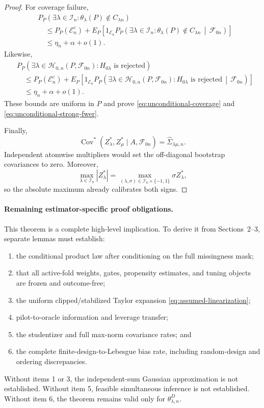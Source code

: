 \documentclass[11pt]{article}
\theoremstyle{definition}
\newcommand{\1}{\mathbf 1}\newcommand{\op}{\operatorname}
\begin{document}
\begin{proof}
For coverage failure,
\begin{align*}
&P_P\!\left(
\exists\lambda\in\mathcal I_n:
\theta_\lambda(P)\notin C_{\lambda n}
\right)
\\
&\quad\le
P_P(\mathcal E_n^c)
+
E_P\!\left[
1_{\mathcal E_n}
P_P\!\left(
\exists\lambda\in\mathcal I_n:
\theta_\lambda(P)\notin C_{\lambda n}
\,\middle|\,
\mathcal F_{0n}
\right)
\right]
\\
&\quad\le
\eta_n+\alpha+o(1).
\end{align*}
Likewise,
\begin{align*}
&P_P\!\left(
\exists\lambda\in\mathcal H_{0,n}(P,\mathcal F_{0n}):
H_{0\lambda}\text{ is rejected}
\right)
\\
&\quad\le
P_P(\mathcal E_n^c)
+
E_P\!\left[
1_{\mathcal E_n}
P_P\!\left(
\exists\lambda\in\mathcal H_{0,n}(P,\mathcal F_{0n}):
H_{0\lambda}\text{ is rejected}
\,\middle|\,
\mathcal F_{0n}
\right)
\right]
\\
&\quad\le
\eta_n+\alpha+o(1).
\end{align*}
These bounds are uniform in $P$ and prove
\eqref{eq:unconditional-coverage} and
\eqref{eq:unconditional-strong-fwer}.

Finally,
\[
\operatorname{Cov}^*(Z_\lambda^*,Z_\mu^*
\mid A,\mathcal F_{0n})
=
\widehat\Sigma_{\lambda\mu,n}.
\]
Independent atomwise multipliers would set the off-diagonal bootstrap
covariances to zero. Moreover,
\[
\max_{\lambda\in\mathcal I_n}|Z_\lambda^*|
=
\max_{(\lambda,\sigma)\in
\mathcal I_n\times\{-1,1\}}
\sigma Z_\lambda^*,
\]
so the absolute maximum already calibrates both signs.
\end{proof}

\paragraph{Remaining estimator-specific proof obligations.}
This theorem is a complete high-level implication. To derive it from
Sections~2--3, separate lemmas must establish:
\begin{enumerate}
\item the conditional product law after conditioning on the full
missingness mask;
\item that all active-fold weights, gates, propensity estimates, and
tuning objects are frozen and outcome-free;
\item the uniform clipped/stabilized Taylor expansion
\eqref{eq:assumed-linearization};
\item pilot-to-oracle information and leverage transfer;
\item the studentizer and full max-norm covariance rates; and
\item the complete finite-design-to-Lebesgue bias rate, including
random-design and ordering discrepancies.
\end{enumerate}
Without items 1 or 3, the independent-sum Gaussian approximation is not
established. Without item 5, feasible simultaneous inference is not
established. Without item 6, the theorem remains valid only for
$\theta_{\lambda,n}^D$.
\end{document}
